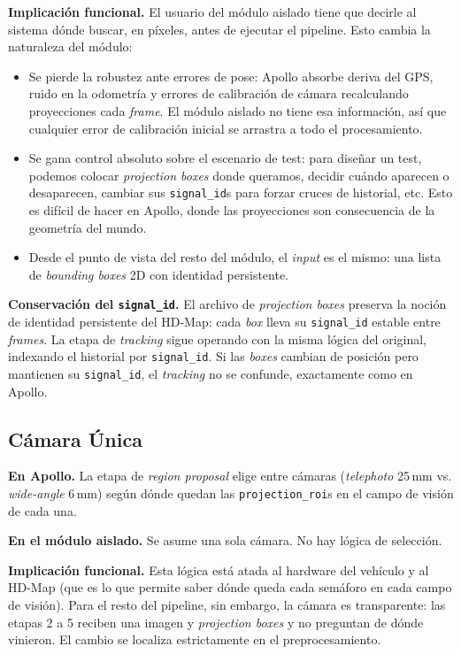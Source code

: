 \textbf{Implicación funcional.} El usuario del módulo aislado tiene que decirle al sistema dónde buscar, en píxeles, antes de ejecutar el pipeline. Esto cambia la naturaleza del módulo:

\begin{itemize}
    \item Se pierde la robustez ante errores de pose: Apollo absorbe deriva del GPS, ruido en la odometría y errores de calibración de cámara recalculando proyecciones cada \textit{frame}. El módulo aislado no tiene esa información, así que cualquier error de calibración inicial se arrastra a todo el procesamiento.
    \item Se gana control absoluto sobre el escenario de test: para diseñar un test, podemos colocar \textit{projection boxes} donde queramos, decidir cuándo aparecen o desaparecen, cambiar sus \texttt{signal\_id}s para forzar cruces de historial, etc. Esto es difícil de hacer en Apollo, donde las proyecciones son consecuencia de la geometría del mundo.
    \item Desde el punto de vista del resto del módulo, el \textit{input} es el mismo: una lista de \textit{bounding boxes} 2D con identidad persistente.
\end{itemize}

\textbf{Conservación del \texttt{signal\_id}.} El archivo de \textit{projection boxes} preserva la noción de identidad persistente del HD-Map: cada \textit{box} lleva su \texttt{signal\_id} estable entre \textit{frames}. La etapa de \textit{tracking} sigue operando con la misma lógica del original, indexando el historial por \texttt{signal\_id}. Si las \textit{boxes} cambian de posición pero mantienen su \texttt{signal\_id}, el \textit{tracking} no se confunde, exactamente como en Apollo.

\subsection{Cámara Única}

\textbf{En Apollo.} La etapa de \textit{region proposal} elige entre cámaras (\textit{telephoto} 25\,mm vs. \textit{wide-angle} 6\,mm) según dónde quedan las \texttt{projection\_roi}s en el campo de visión de cada una.

\textbf{En el módulo aislado.} Se asume una sola cámara. No hay lógica de selección.

\textbf{Implicación funcional.} Esta lógica está atada al hardware del vehículo y al HD-Map (que es lo que permite saber dónde queda cada semáforo en cada campo de visión). Para el resto del pipeline, sin embargo, la cámara es transparente: las etapas 2 a 5 reciben una imagen y \textit{projection boxes} y no preguntan de dónde vinieron. El cambio se localiza estrictamente en el preprocesamiento.

